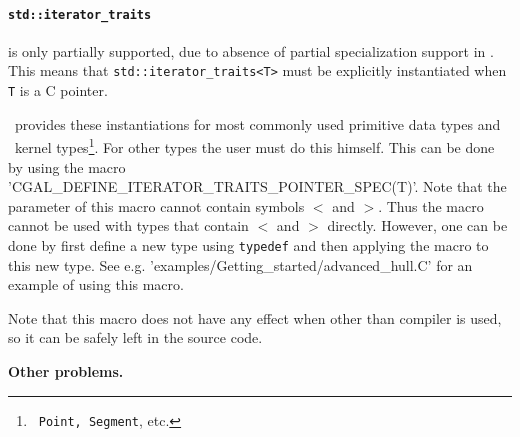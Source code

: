 \paragraph{\texttt{std::iterator\_traits}} is only partially
supported, due to absence of partial specialization support in \msvc.
This means that \texttt{std::iterator\_traits<T>} must be explicitly
instantiated when \texttt{T} is a C pointer. 

\cgal\ provides
these instantiations for most commonly used primitive data types and
\cgal\ kernel types\footnote{\cgal\ \texttt{Point, Segment}, etc.}.
For other types the user must do this himself.  
This can be done by using the macro
\nonlinkedpath'CGAL_DEFINE_ITERATOR_TRAITS_POINTER_SPEC(T)'.
Note that the parameter of this macro cannot contain symbols $<$ and
$>$. Thus the macro cannot be used with types that contain $<$ and $>$
directly. However, one can be done by first define a new type using 
\texttt{typedef} and then applying the macro to this new type.
See e.g. \nonlinkedpath'examples/Getting_started/advanced_hull.C'
for an example of using this macro.

Note that this macro does not have any effect when other than
 compiler is used, so it can be safely left in the source code. 
\medskip

\textbf{Other problems.}

